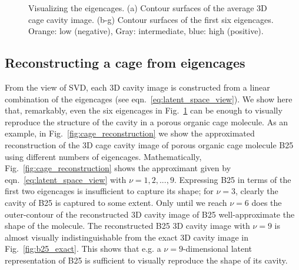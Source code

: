 \documentclass[journal=jacsat,manuscript=article,layout=traditional]{achemso}
\begin{document}
\begin{figure}
		\qquad
	\caption{Visualizing the eigencages. (a) Contour surfaces of the average 3D cage cavity image. (b-g) Contour surfaces of the first six eigencages. Orange: low (negative), Gray: intermediate, blue: high (positive).
	} \label{fig:eigencages}
\end{figure}

\subsection{Reconstructing a cage from eigencages} From the view of SVD, each 3D cavity image is constructed from a linear combination of the eigencages (see eqn.~\ref{eq:latent_space_view}). We show here that, remarkably, even the six eigencages in Fig.~\ref{fig:eigencages} can be enough to visually reproduce the structure of the cavity in a porous organic cage molecule. As an example, in Fig.~\ref{fig:cage_reconstruction} we show the approximated reconstruction of the 3D cage cavity image of porous organic cage molecule B25 using different numbers of eigencages. Mathematically, Fig.~\ref{fig:cage_reconstruction} shows the approximant given by eqn.~\ref{eq:latent_space_view} with $\nu=1,2,...,9$. Expressing B25 in terms of the first two eigencages is insufficient to capture its shape; for $\nu=3$, clearly the cavity of B25 is captured to some extent. Only until we reach $\nu=6$ does the outer-contour of the reconstructed 3D cavity image of B25 well-approximate the shape of the molecule. The reconstructed B25 3D cavity image with $\nu=9$ is almost visually indistinguishable from the exact 3D cavity image in Fig.~\ref{fig:b25_exact}. This shows that e.g. a $\nu=9$-dimensional latent representation of B25 is sufficient to visually reproduce the shape of its cavity.
\end{document}
